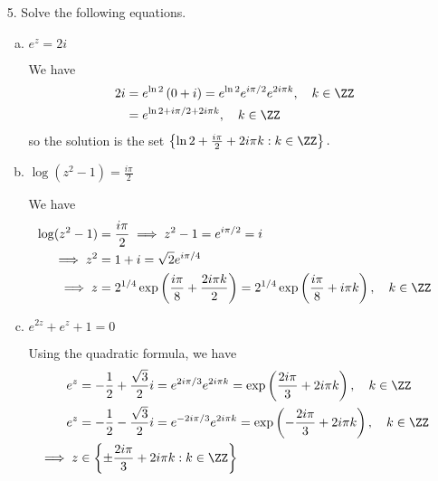 \documentclass{article}
\begin{document}
\begin{itemize}
	\item[5.] Solve the following equations.
		\begin{enumerate}[(a)]
			\item $e^z=2i$
				\begin{soln}
					We have
					\begin{align*}
						2i &= e^{\ln 2}\left( 0 + i \right) = e^{\ln 2} e^{i\pi/2}e^{2i\pi k}, \quad k\in\ZZ \\
						&= e^{\ln 2 + i\pi/2 + 2i\pi k}, \quad k\in\ZZ
					\end{align*}
					so the solution is the set $\left\{ \ln 2+\frac{i\pi}{2} + 2i\pi k:k\in\ZZ \right\}.$
				\end{soln}

			\item $\log(z^2-1)=\frac{i\pi}{2}$
				\begin{soln}
					We have
					\begin{align*}
						\log(z^2-1) &= \frac{i\pi}{2} \implies z^2-1 = e^{i\pi/2} = i \\
						\implies z^2 &= 1 + i = \sqrt{2} e^{i\pi/4} \\
						\implies z &= 2^{1/4} \exp\left( \frac{i\pi}{8} + \frac{2i\pi k}{2} \right) = 2^{1/4}\exp\left( \frac{i\pi}{8} + i\pi k \right), \quad k\in\ZZ
					\end{align*}
				\end{soln}

			\item $e^{2z}+e^z+1=0$
				\begin{soln}
					Using the quadratic formula, we have
					\begin{align*}
						e^z &= -\frac{1}{2} + \frac{\sqrt{3}}{2} i = e^{2i\pi/3} e^{2i\pi k} = \exp\left( \frac{2i\pi}{3} + 2i\pi k \right), \quad k\in\ZZ \\
						e^{z} &= -\frac{1}{2} - \frac{\sqrt{3}}{2} i = e^{-2i\pi/3}e^{2i\pi k} = \exp\left( -\frac{2i\pi}{3} + 2i\pi k \right), \quad k\in\ZZ \\
						\implies z &\in \left\{ \pm \frac{2i\pi}{3} + 2i\pi k: k\in\ZZ \right\}
					\end{align*}
				\end{soln}
				
		\end{enumerate}
	

\end{itemize}
\end{document}
